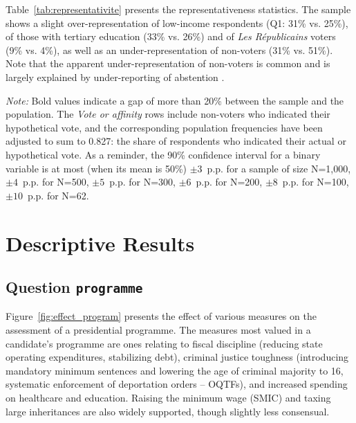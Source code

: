 \documentclass[12pt,english]{article}
\newcommand{\blue}[1]{\textcolor{blue!60!black}{#1}}
\begin{document}
Table~\ref{tab:representativite} presents the representativeness statistics. The sample shows a slight over-representation of low-income respondents (Q1: 31\% vs. 25\%), of those with tertiary education (33\% vs. 26\%) and of \textit{Les Républicains} voters (9\% vs. 4\%), as well as an under-representation of non-voters (31\% vs. 51\%). Note that the apparent under-representation of non-voters is common and is largely explained by under-reporting of abstention \citep{sciarini_turnout_2016}.

\begin{table}[htbp]
  \centering
  \caption{Sample representativeness.}
  \label{tab:representativite}
  
  \par\smallskip
  {\footnotesize \textit{Note:} Bold values indicate a gap of more than 20\% between the sample and the population. The \textit{Vote or affinity} rows include non-voters who indicated their hypothetical vote, and the corresponding population frequencies have been adjusted to sum to 0.827: the share of respondents who indicated their actual or hypothetical vote.
  As a reminder, the 90\% confidence interval for a binary variable is at most (when its mean is 50\%) $\pm3$~p.p. for a sample of size N=1,000, $\pm4$~p.p. for N=500, $\pm5$~p.p. for N=300, $\pm6$~p.p. for N=200, $\pm8$~p.p. for N=100, $\pm10$~p.p. for N=62.
  }
\end{table}


\section{Descriptive Results}
\label{sec:resultats}

\subsection{Question \texttt{programme}}

Figure~\ref{fig:effect_program} presents the effect of various measures on the assessment of a presidential programme. \blue{The measures most valued in a candidate's programme are ones relating to fiscal discipline (reducing state operating expenditures, stabilizing debt), criminal justice toughness (introducing mandatory minimum sentences and lowering the age of criminal majority to 16, systematic enforcement of deportation orders -- OQTFs), and increased spending on healthcare and education. Raising the minimum wage (SMIC) and taxing large inheritances are also widely supported, though slightly less consensual.}
\end{document}
